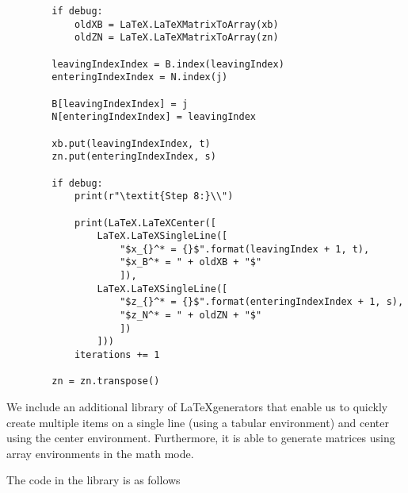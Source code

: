 \documentclass{article}
\begin{document}
\begin{lstlisting}
        if debug:
            oldXB = LaTeX.LaTeXMatrixToArray(xb)
            oldZN = LaTeX.LaTeXMatrixToArray(zn)

        leavingIndexIndex = B.index(leavingIndex)
        enteringIndexIndex = N.index(j)

        B[leavingIndexIndex] = j
        N[enteringIndexIndex] = leavingIndex

        xb.put(leavingIndexIndex, t)
        zn.put(enteringIndexIndex, s)

        if debug:
            print(r"\textit{Step 8:}\\")

            print(LaTeX.LaTeXCenter([
                LaTeX.LaTeXSingleLine([
                    "$x_{}^* = {}$".format(leavingIndex + 1, t),
                    "$x_B^* = " + oldXB + "$"
                    ]),
                LaTeX.LaTeXSingleLine([
                    "$z_{}^* = {}$".format(enteringIndexIndex + 1, s),
                    "$z_N^* = " + oldZN + "$"
                    ])
                ]))
            iterations += 1

        zn = zn.transpose()
\end{lstlisting}

We include an additional library of \LaTeX generators that enable us to quickly
create multiple items on a single line (using a tabular environment) and center
using the center environment. Furthermore, it is able to generate matrices using
array environments in the math mode.

The code in the library is as follows
\end{document}
